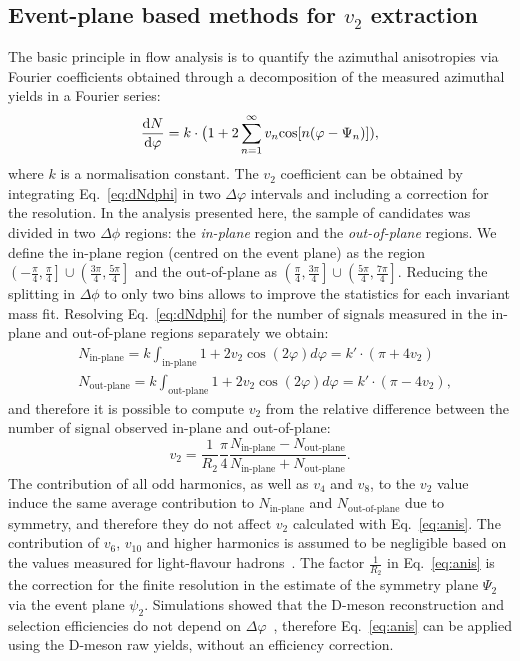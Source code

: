 \subsection{Event-plane based methods for $v_2$ extraction} 
\label{sec:epMethodsDescript}
The basic principle in flow analysis is to quantify the azimuthal 
anisotropies via Fourier coefficients obtained through a 
decomposition of the measured azimuthal yields in a Fourier series:
\begin{equation}
\label{eq:dNdphi}
\frac{{\rm d} N}{{\rm d} \varphi} = k \cdot \big ( 1 + 2 \sum_{n=1}^{\infty} v_n {\rm cos}[n (\varphi - \Psi_n)] ),
\end{equation}
where $k$ is a normalisation constant. 
The $v_2$ coefficient can be obtained by integrating Eq.~\ref{eq:dNdphi}
in two $\Delta \varphi$ intervals and including a correction for the
resolution. In the analysis presented here, the sample of candidates was 
divided in two $\Delta\phi$ regions: the \textit{in-plane} region 
and the \textit{out-of-plane} regions. We define the in-plane 
region (centred on the event plane) as the region 
$\left(-\frac{\pi}{4},\frac{\pi}{4}\right]\cup\left(\frac{3\pi}{4},\frac{5\pi}{4}\right]$ and
 the out-of-plane as $\left(\frac{\pi}{4},\frac{3\pi}{4}\right]\cup\left(\frac{5\pi}{4},\frac{7\pi}{4}\right]$. 
 Reducing the splitting in $\Delta\phi$ to only two bins allows 
 to improve the statistics for each invariant mass fit. Resolving 
 Eq.~\ref{eq:dNdphi} for the number of signals measured 
 in the in-plane and out-of-plane regions separately we obtain:
\begin{equation}\label{eq:ninout}
 \begin{split}
  & N_\text{in-plane} = k\int_\text{in-plane}1+2v_2\cos(2\varphi)d\varphi = k'\cdot(\pi+4v_2)\\
  & N_\text{out-plane} = k\int_\text{out-plane}1+2v_2\cos(2\varphi)d\varphi= k'\cdot(\pi-4v_2),
 \end{split}
\end{equation}
and therefore it is possible to compute $v_2$ from the relative 
difference between the number of signal observed in-plane and out-of-plane:
\begin{equation}
\label{eq:anis}
 v_2 = \frac{1}{R_2} \frac{\pi}{4}\frac{N_\text{in-plane}-N_\text{out-plane}}{N_\text{in-plane}+N_\text{out-plane}}.
\end{equation}
The contribution of all odd harmonics, 
as well as $v_4$ and $v_8$, to the $v_2$ value induce the same average 
contribution to $N_\text{in-plane}$ and $N_\text{out-of-plane}$ 
due to symmetry, and therefore they do not affect $v_2$ calculated with 
Eq.~\ref{eq:anis}. The contribution of $v_6$, $v_{10}$ and higher 
harmonics is assumed to be negligible based on the 
values measured for light-flavour hadrons~\cite{Aamodt:2011by,ATLAS:2012atc}.
The factor $\frac{1}{R_2}$ in Eq.~\ref{eq:anis} is the correction for the finite resolution in the
estimate of the symmetry plane $\Psi_2$ via the event plane $\psi_2$.
 Simulations showed that the D-meson reconstruction 
 and selection efficiencies do not depend on $\Delta\varphi$~\cite{Abelev:2014ipa}, 
therefore Eq.~\ref{eq:anis} can be applied using the 
D-meson raw yields, without an efficiency correction.

